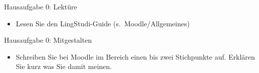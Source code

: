 \begin{frame}{Hausaufgabe 0: Lektüre}

\begin{itemize}
	\item Lesen Sie den LingStudi-Guide (s.~Moodle/Allgemeines)
\end{itemize}

\end{frame}


\begin{frame}{Hausaufgabe 0: Mitgestalten}

\begin{itemize}
	\item Schreiben Sie bei Moodle im Bereich  einen bis zwei Stichpunkte auf. Erklären Sie kurz  was Sie damit meinen.
	
\end{itemize}

\end{frame}
